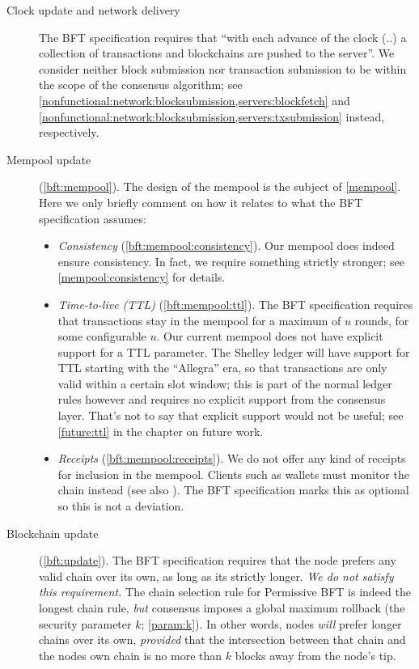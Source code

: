 \begin{description}
  \item[Clock update and network delivery] The BFT specification requires that
  ``with each advance of the clock (..) a collection of transactions and
  blockchains are pushed to the server''. We consider neither block submission
  nor transaction submission to be within the scope of the consensus algorithm;
  see \cref{nonfunctional:network:blocksubmission,servers:blockfetch} and
  \cref{nonfunctional:network:blocksubmission,servers:txsubmission} instead, respectively.

  \item[Mempool update] (\cref{bft:mempool}). The design of the mempool is the
  subject of \cref{mempool}. Here we only briefly comment on how it relates to
  what the BFT specification assumes:
%
  \begin{itemize}
    \item \textit{Consistency} (\cref{bft:mempool:consistency}). Our mempool
    does indeed ensure consistency. In fact, we require something strictly
    stronger; see \cref{mempool:consistency} for details.
    \item \textit{Time-to-live (TTL)} (\cref{bft:mempool:ttl}). The BFT
    specification requires that transactions stay in the mempool for a maximum
    of $u$ rounds, for some configurable $u$. Our current mempool does not have
    explicit support for a TTL parameter. The Shelley ledger will have support
    for TTL starting with the ``Allegra'' era, so that transactions are only
    valid within a certain slot window; this is part of the normal ledger rules
    however and requires no explicit support from the consensus layer. That's
    not to say that explicit support would not be useful; see \cref{future:ttl}
    in the chapter on future work.
    \item \textit{Receipts} (\cref{bft:mempool:receipts}). We do not offer any
    kind of receipts for inclusion in the mempool. Clients such as wallets must
    monitor the chain instead (see also \cite{wallet-spec}). The BFT
    specification marks this as optional so this is not a deviation.
  \end{itemize}
%
  \item[Blockchain update] (\cref{bft:update}). The BFT specification requires
  that the node prefers any valid chain over its own, as long as its strictly
  longer. \emph{We do not satisfy this requirement.} The chain selection rule
  for Permissive BFT is indeed the longest chain rule, \emph{but} consensus
  imposes a global maximum rollback (the security parameter $k$;
  \cref{param:k}). In other words, nodes \emph{will} prefer longer chains over
  its own, \emph{provided} that the intersection between that chain and the
  nodes own chain is no more than $k$ blocks away from the node's tip.


\end{description}
